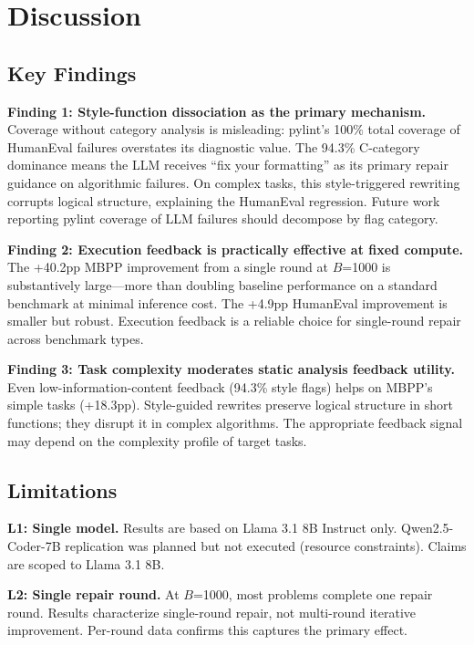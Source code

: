\section{Discussion}
\label{sec:discussion}

\subsection{Key Findings}

\textbf{Finding 1: Style-function dissociation as the primary mechanism.} Coverage without category analysis is misleading: pylint's 100\% total coverage of HumanEval failures overstates its diagnostic value. The 94.3\% C-category dominance means the LLM receives ``fix your formatting'' as its primary repair guidance on algorithmic failures. On complex tasks, this style-triggered rewriting corrupts logical structure, explaining the HumanEval regression. Future work reporting pylint coverage of LLM failures should decompose by flag category.

\textbf{Finding 2: Execution feedback is practically effective at fixed compute.} The +40.2pp MBPP improvement from a single round at $B$=1000 is substantively large---more than doubling baseline performance on a standard benchmark at minimal inference cost. The +4.9pp HumanEval improvement is smaller but robust. Execution feedback is a reliable choice for single-round repair across benchmark types.

\textbf{Finding 3: Task complexity moderates static analysis feedback utility.} Even low-information-content feedback (94.3\% style flags) helps on MBPP's simple tasks (+18.3pp). Style-guided rewrites preserve logical structure in short functions; they disrupt it in complex algorithms. The appropriate feedback signal may depend on the complexity profile of target tasks.

\subsection{Limitations}

\textbf{L1: Single model.} Results are based on Llama 3.1 8B Instruct only. Qwen2.5-Coder-7B replication was planned but not executed (resource constraints). Claims are scoped to Llama 3.1 8B.

\textbf{L2: Single repair round.} At $B$=1000, most problems complete one repair round. Results characterize single-round repair, not multi-round iterative improvement. Per-round data confirms this captures the primary effect.

